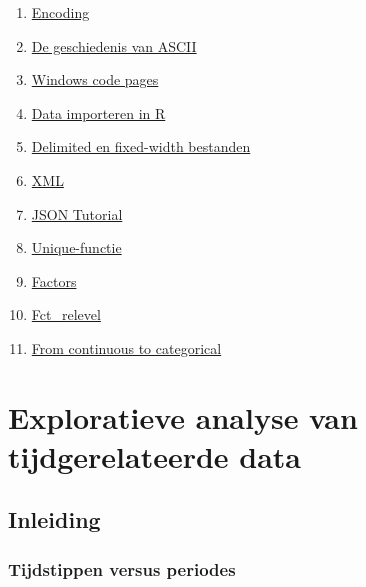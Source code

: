 \documentclass[]{memoir}
\providecommand{\tightlist}{%
  \setlength{\itemsep}{0pt}\setlength{\parskip}{0pt}}
\begin{document}
\begin{enumerate}
\def\labelenumi{\arabic{enumi}.}
\tightlist
\item
  \href{http://kunststube.net/encoding/}{Encoding}
\item
  \href{https://www.joelonsoftware.com/2003/10/08/the-absolute-minimum-every-software-developer-absolutely-positively-must-know-about-unicode-and-character-sets-no-excuses/}{De
  geschiedenis van ASCII}
\item
  \href{https://en.wikipedia.org/wiki/Windows_code_page}{Windows code
  pages}
\item
  \href{http://r4ds.had.co.nz/data-import.html}{Data importeren in R}
\item
  \href{https://www.techwalla.com/articles/what-is-a-delimited-a-fixed-width-file}{Delimited
  en fixed-width bestanden}
\item
  \href{https://www.w3schools.com/xml/default.asp}{XML}
\item
  \href{http://beginnersbook.com/2015/04/json-tutorial/}{JSON Tutorial}
\item
  \href{https://chemicalstatistician.wordpress.com/2018/03/10/use-unique-instead-of-levels-to-find-the-possible-values-of-a-character-variable-in-r/}{Unique-functie}
\item
  \href{http://r4ds.had.co.nz/factors.html}{Factors}
\item
  \href{http://forcats.tidyverse.org/reference/fct_relevel.html}{Fct\_relevel}
\item
  \href{http://rforpublichealth.blogspot.be/2012/09/from-continuous-to-categorical.html}{From
  continuous to categorical}
\end{enumerate}

\chapter{Exploratieve analyse van tijdgerelateerde
data}\label{exploratieve-analyse-van-tijdgerelateerde-data}

\section{Inleiding}\label{inleiding}

\subsection{Tijdstippen versus
periodes}\label{tijdstippen-versus-periodes}
\end{document}
